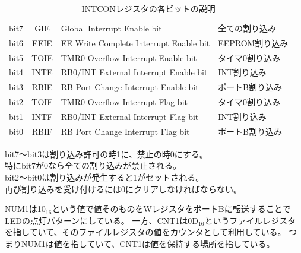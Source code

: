 \documentclass[a4paper,12pt]{ujarticle}
\begin{document}
    \begin{table}[htbp]
     \begin{center}
      \caption{INTCONレジスタの各ビットの説明}
      \label{INTCON-bit}
      \begin{tabular}{|c|c|l|l|}\hline
       bit7&GIE&Global Interrupt Enable bit&全ての割り込み \\
       bit6&EEIE&EE Write Complete Interrupt Enable bit&EEPROM割り込み \\
       bit5&TOIE&TMR0 Overflow Interrupt Enable bit&タイマ0割り込み \\
       bit4&INTE&RB0/INT External Interrupt Enable bit&INT割り込み \\
       bit3&RBIE&RB Port Change Interrupt Enable bit&ポートB割り込み \\ \hline
       bit2&TOIF&TMR0 Overflow Interrupt Flag bit&タイマ0割り込み \\
       bit1&INTF&RB0/INT External Interrupt Flag bit&INT割り込み \\
       bit0&RBIF&RB Port Change Interrupt Flag bit&ポートB割り込み \\ \hline
      \end{tabular}

      bit7〜bit3は割り込み許可の時1に、禁止の時0にする。\\
      特にbit7が0なら全ての割り込みが禁止される。\\
      bit2〜bit0は割り込みが発生すると1がセットされる。\\
      再び割り込みを受け付けるには0にクリアしなければならない。\\
     \end{center}
    \end{table}

    NUM1は10$_{16}$という値で値そのものをWレジスタをポートBに転送することでLEDの点灯パターンにしている。
    一方、CNT1は0D$_{16}$というファイルレジスタを指していて、そのファイルレジスタの値をカウンタとして利用している。
    つまりNUM1は値を指していて、CNT1は値を保持する場所を指している。
\end{document}
